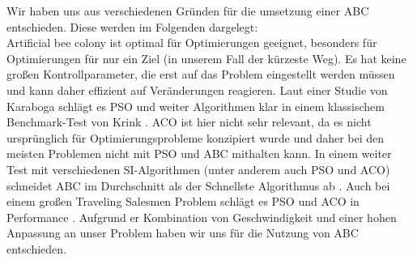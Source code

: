 Wir haben uns aus verschiedenen Gründen für die umsetzung einer ABC entschieden. Diese werden im Folgenden dargelegt:\\
 Artificial bee colony ist optimal für Optimierungen geeignet, besonders für Optimierungen für nur ein Ziel (in unserem Fall der kürzeste Weg). Es hat keine großen Kontrollparameter, die erst auf das Problem eingestellt werden müssen und kann daher effizient auf Veränderungen reagieren. Laut einer Studie von Karaboga \cite{karaboga2008performance} schlägt es PSO und weiter Algorithmen klar in einem klassischem Benchmark-Test von Krink \cite{krink2004noisy}. ACO ist hier nicht sehr relevant, da es nicht ursprünglich für Optimierungsprobleme konzipiert wurde und daher bei den meisten Problemen nicht mit PSO und ABC mithalten kann. In einem weiter Test mit verschiedenen SI-Algorithmen (unter anderem auch PSO und ACO) schneidet ABC im Durchschnitt als der Schnellste Algorithmus ab \cite{ab2015comprehensive}. Auch bei einem großen Traveling Salesmen Problem schlägt es PSO und ACO in Performance \cite{sabet2016comparison}.
Aufgrund er Kombination von Geschwindigkeit und einer hohen Anpassung an unser Problem haben wir uns für die Nutzung von ABC entschieden.





